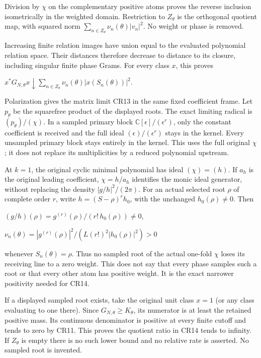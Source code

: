 Division by \(\chi\) on the complementary positive atoms proves the reverse inclusion isometrically in the weighted domain. Restriction to \(Z_\theta\) is the orthogonal quotient map, with squared norm \(\sum_{n\in Z_\theta}\nu_n(\theta)|v_n|^2\). No weight or phase is removed.

Increasing finite relation images have union equal to the evaluated polynomial relation space. Their distances therefore decrease to distance to its closure, including singular finite phase Grams. For every class \(x\), this proves

\(x^*G_{N,\theta}x\downarrow\sum_{n\in Z_\theta}\nu_n(\theta)|x(S_n(\theta))|^2\).

Polarization gives the matrix limit CR13 in the same fixed coefficient frame. Let \(p_\theta\) be the squarefree product of the displayed roots. The exact limiting radical is \((p_\theta)/(\chi)\). In a sampled primary block \(\mathbb C[\epsilon]/(\epsilon^r)\), only the constant coefficient is received and the full ideal \((\epsilon)/(\epsilon^r)\) stays in the kernel. Every unsampled primary block stays entirely in the kernel. This uses the full original \(\chi\); it does not replace its multiplicities by a reduced polynomial upstream.

At \(k=1\), the original cyclic minimal polynomial has ideal \((\chi)=(h)\). If \(a_h\) is the original leading coefficient, \(\chi=h/a_h\) identifies the monic ideal generator, without replacing the density \(|g/h|^2/(2\pi)\). For an actual selected root \(\rho\) of complete order \(r\), write \(h=(S-\rho)^rh_0\), with the unchanged \(h_0(\rho)\ne0\). Then

\((g/h)(\rho)=g^{(r)}(\rho)/(r!\,h_0(\rho))\ne0\),

\(\nu_n(\theta)=|g^{(r)}(\rho)|^2/(L(r!)^2|h_0(\rho)|^2)>0\)

whenever \(S_n(\theta)=\rho\). Thus no sampled root of the actual one-fold \(\chi\) loses its receiving line to a zero weight. This does not say that every phase samples such a root or that every other atom has positive weight. It is the exact narrower positivity needed for CR14.

If a displayed sampled root exists, take the original unit class \(x=1\) (or any class evaluating to one there). Since \(G_{N,\theta}\ge K_\theta\), its numerator is at least the retained positive mass. Its continuous denominator is positive at every finite cutoff and tends to zero by CR11. This proves the quotient ratio in CR14 tends to infinity. If \(Z_\theta\) is empty there is no such lower bound and no relative rate is asserted. No sampled root is invented.

